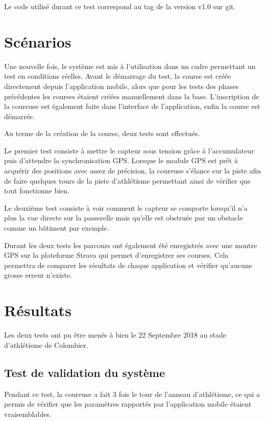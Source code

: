 Le code utilisé durant ce test correspond au tag de la version v1.0 sur git.

\section{Scénarios}

Une nouvelle fois, le système est mis à l'utilisation dans un cadre permettant un test en conditions réelles. Avant le démarrage du test, la course est créée directement depuis l'application mobile, alors que pour les tests des phases précédentes les courses étaient créées manuellement dans la base. L'inscription de la coureuse est également faite dans l'interface de l'application, enfin la course est démarrée.

Au terme de la création de la course, deux tests sont effectués.

Le premier test consiste à mettre le capteur sous tension grâce à l'accumulateur puis d'attendre la synchronisation GPS. Lorsque le module GPS est prêt à acquérir des positions avec assez de précision, la coureuse s'élance sur la piste afin de faire quelques tours de la piste d'athlétisme permettant ainsi de vérifier que tout fonctionne bien.

Le deuxième test consiste à voir comment le capteur se comporte lorsqu'il n'a plus la vue directe sur la passerelle mais qu'elle est obstruée par un obstacle comme un bâtiment par exemple.

Durant les deux tests les parcours ont également été enregistrés  avec une montre GPS sur la plateforme Strava qui permet d'enregistrer ses courses. Cela permettra de comparer les résultats de chaque application et vérifier qu'aucune grosse erreur n'existe.

\section{Résultats}

Les deux tests ont pu être menés à bien le 22 Septembre 2018 au stade d'athlétisme de Colombier.

\subsection{Test de validation du système}

Pendant ce test, la coureuse a fait 3 fois le tour de l'anneau d'athlétisme, ce qui a permis de vérifier que les paramètres rapportés par l'application mobile étaient vraisemblables.

